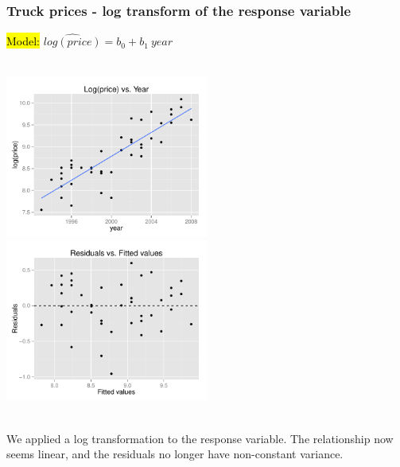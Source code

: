 \documentclass[slidestop,compress,mathserif,12pt,t,professionalfonts,xcolor=table]{beamer}
\begin{document}
\begin{frame}
\frametitle{Truck prices - log transform of the response variable}

\hl{Model:} $\widehat{log(price)} = b_0 + b_1~year$

$\:$ \\

\includegraphics[width=0.5\textwidth]{figures/pickup/pu_price_year_scat_log} 
\includegraphics[width=0.5\textwidth]{figures/pickup/pu_price_year_res_log}

\pause

$\:$ \\

We applied a log transformation to the response variable. The relationship now seems linear, and the residuals 
no longer have non-constant variance.

\end{frame}

\end{document}
